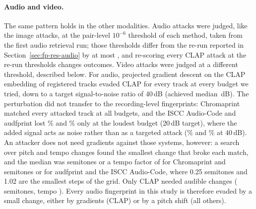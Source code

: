 \paragraph{Audio and video.} The same pattern holds in the other modalities. Audio attacks were judged, like the image attacks, at the pair-level $10^{-6}$ threshold of each method, taken from the first audio retrieval run; those thresholds differ from the re-run reported in Section~\ref{sec:fp-res-audio} by at most , and re-scoring every CLAP attack at the re-run thresholds changes  outcomes. Video attacks were judged at a different threshold, described below. For audio, projected gradient descent on the CLAP embedding of  registered tracks evaded CLAP for every track at every budget we tried, down to a target signal-to-noise ratio of 40\,dB (achieved median \,dB). The perturbation did not transfer to the recording-level fingerprints: Chromaprint matched every attacked track at all budgets, and the ISCC Audio-Code and audfprint lost \% and \% only at the loudest budget (20\,dB target), where the added signal acts as noise rather than as a targeted attack (\% and \% at 40\,dB). An attacker does not need gradients against those systems, however: a search over pitch and tempo changes found the smallest change that broke each match, and the median was  semitones or a tempo factor of  for Chromaprint and  semitones or  for audfprint and the ISCC Audio-Code, where 0.25 semitones and 1.02 are the smallest steps of the grid. Only CLAP needed audible changes ( semitones, tempo ). Every audio fingerprint in this study is therefore evaded by a small change, either by gradients (CLAP) or by a pitch shift (all others).

